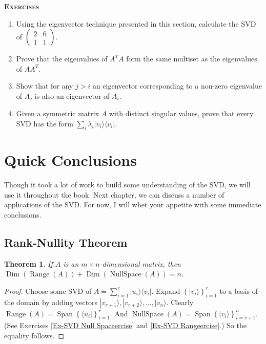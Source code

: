 \documentclass{amsbook}
\newtheorem{theorem}{Theorem}
\begin{document}
{\bfseries\scshape\Large Exercises}

\begin{enumerate}
\item Using the eigenvector technique presented in this section, calculate the SVD of $\left(\begin{array}{cc}2&6\\1&1\end{array}\right)$.
\item Prove that the eigenvalues of $A^TA$ form the same multiset as the eigenvalues of $AA^T$.
\item Show that for any $j>i$ an eigenvector corresponding to a non-zero eigenvalue of $A_j$ is also an eigenvector of $A_i$.
\item Given a symmetric matrix $A$ with distinct singular values, prove that every SVD has the form $\sum_i\lambda_i|v_i\rangle\langle v_i|$.
\end{enumerate}

\section{Quick Conclusions}\label{Quick Conclusions}

Though it took a lot of work to build some understanding of the SVD, we will use it throughout the book.  Next chapter, we can discuss a number of applications of the SVD.  For now, I will whet your appetite with some immediate conclusions.

\subsection{Rank-Nullity Theorem}

 \begin{theorem}
If $A$ is an $m\times n$-dimensional matrix, then $\operatorname{Dim}\left(\operatorname{Range}(A)\right)+\operatorname{Dim}\left(\operatorname{NullSpace}(A)\right)=n$.
 \end{theorem}

\begin{proof}
Choose some SVD of $A=\sum_{i=1}^r|u_i\rangle\langle v_i|$.  Expand $\left\{|v_i\rangle\right\}_{i=1}^r$ to a basis of the domain by adding vectors $|v_{r+1}\rangle, |v_{r+2}\rangle, ..., |v_n\rangle$.  Clearly $\operatorname{Range}(A)=\operatorname{Span}\left\{\langle u_i|\right\}_{i=1}^r$.  And $\operatorname{NullSpace}(A)=\operatorname{Span}\left\{|v_i\rangle\right\}_{i=r+1}^n$.  (See Exercises \ref{Ex-SVD Null Spaceercise} and \ref{Ex-SVD Rangeercise}.)  So the equality follows.
\end{proof}
\end{document}
